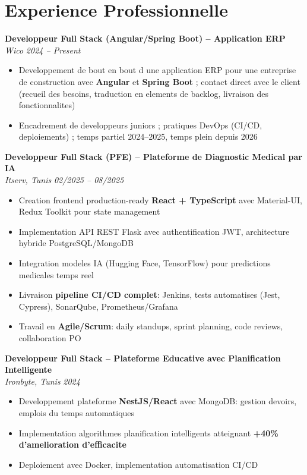 \documentclass[10pt,a4paper]{article}
\begin{document}
\vspace{3pt}

\section*{Experience Professionnelle}
\vspace{2pt}

{\small

\textbf{Developpeur Full Stack (Angular/Spring Boot) -- Application ERP}\\[1pt]
\textit{Wico} \hfill \textit{2024 -- Present}
\begin{itemize}[leftmargin=12pt,itemsep=1pt,topsep=1pt,parsep=0pt]
  \item Developpement de bout en bout d une application ERP pour une entreprise de construction avec \textbf{Angular} et \textbf{Spring Boot} ; contact direct avec le client (recueil des besoins, traduction en elements de backlog, livraison des fonctionnalites)
  \item Encadrement de developpeurs juniors ; pratiques DevOps (CI/CD, deploiements) ; temps partiel 2024--2025, temps plein depuis 2026
\end{itemize}

\vspace{3pt}
\textbf{Developpeur Full Stack (PFE) -- Plateforme de Diagnostic Medical par IA}\\[1pt]
\textit{Itserv, Tunis} \hfill \textit{02/2025 -- 08/2025}
\begin{itemize}[leftmargin=12pt,itemsep=1pt,topsep=1pt,parsep=0pt]
  \item Creation frontend production-ready \textbf{React + TypeScript} avec Material-UI, Redux Toolkit pour state management
  \item Implementation API REST Flask avec authentification JWT, architecture hybride PostgreSQL/MongoDB
  \item Integration modeles IA (Hugging Face, TensorFlow) pour predictions medicales temps reel
  \item Livraison \textbf{pipeline CI/CD complet}: Jenkins, tests automatises (Jest, Cypress), SonarQube, Prometheus/Grafana
  \item Travail en \textbf{Agile/Scrum}: daily standups, sprint planning, code reviews, collaboration PO
\end{itemize}

\vspace{3pt}
\textbf{Developpeur Full Stack -- Plateforme Educative avec Planification Intelligente}\\[1pt]
\textit{Ironbyte, Tunis} \hfill \textit{2024}
\begin{itemize}[leftmargin=12pt,itemsep=1pt,topsep=1pt,parsep=0pt]
  \item Developpement plateforme \textbf{NestJS/React} avec MongoDB: gestion devoirs, emplois du temps automatiques
  \item Implementation algorithmes planification intelligents atteignant \textbf{+40\% d'amelioration d'efficacite}
  \item Deploiement avec Docker, implementation automatisation CI/CD
\end{itemize}

}
\end{document}
